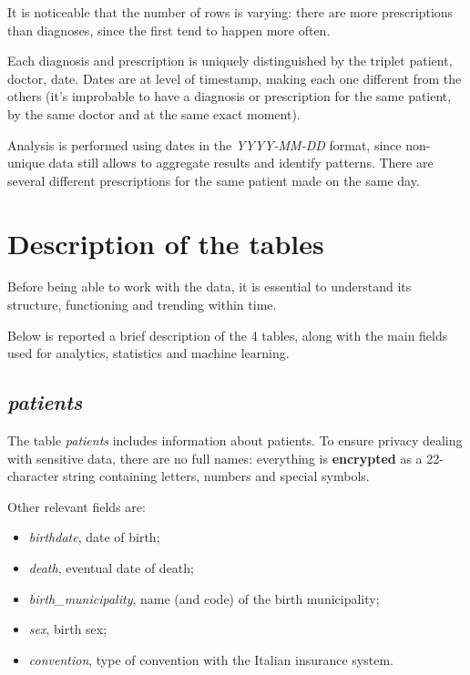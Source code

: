 It is noticeable that the number of rows is varying: there are more prescriptions than diagnoses, since the first tend to happen more often.

Each diagnosis and prescription is uniquely distinguished by the triplet {patient, doctor, date}. Dates are at level of timestamp, making each one different from the others (it's improbable to have a diagnosis or prescription for the same patient, by the same doctor and at the same exact moment). 

Analysis is performed using dates in the \textit{YYYY-MM-DD} format, since non-unique data still allows to aggregate results and identify patterns. There are several different prescriptions for the same patient made on the same day.

\section{Description of the tables}
Before being able to work with the data, it is essential to understand its structure, functioning and trending within time.

Below is reported a brief description of the 4 tables, along with the main fields used for analytics, statistics and machine learning.

\subsection{\textit{patients}}
The table \textit{patients} includes information about patients. To ensure privacy dealing with sensitive data, there are no full names: everything is \textbf{encrypted} as a 22-character string containing letters, numbers and special symbols.

Other relevant fields are:
\begin{itemize}
	\item \textit{birthdate}, date of birth;
	\item \textit{death}, eventual date of death;
	\item \textit{birth\_municipality}, name (and code) of the birth municipality;
	\item \textit{sex}, birth sex;
	\item \textit{convention}, type of convention with the Italian insurance system.
\end{itemize}


